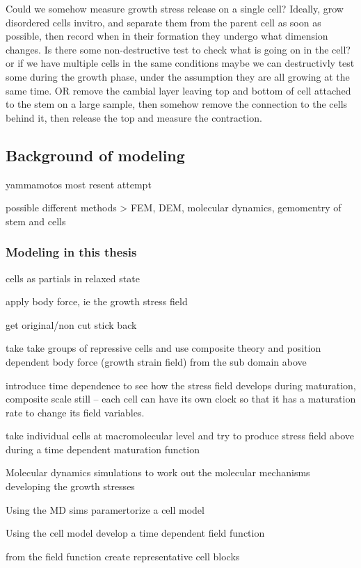 \documentclass{article}
\begin{document}
Could we somehow measure growth stress release on a single cell?
Ideally, grow disordered cells invitro, and separate them from the parent cell
as soon as possible, then record when in their formation they undergo what
dimension changes. Is there some non-destructive test to check what is going on in the cell? or if we have multiple cells in the same conditions maybe we can destructivly test some during the growth phase, under the assumption they are all growing at the same time.
OR
remove the cambial layer leaving top and bottom of cell attached to the stem on a large sample,
then somehow remove the connection to the cells behind it, then release the top and measure the contraction.


\subsection{Background of modeling}

yammamotos most resent attempt

possible different methods > FEM, DEM, molecular dynamics, gemomentry of stem
and cells

\subsubsection{Modeling in this thesis}
cells as partials in relaxed state

apply body force, ie the growth stress field

get original/non cut stick back

take take groups of repressive cells and use composite theory and position dependent body force
(growth strain field) from the sub domain above

introduce time dependence to see how the stress field develops during
maturation, composite scale still -- each cell can have its own clock so that it
has a maturation rate to change its field variables.

take individual cells at macromolecular level and try to produce stress field
above during a time dependent maturation function

Molecular dynamics simulations to work out the molecular mechanisms developing the growth stresses

Using the MD sims paramertorize a cell model

Using the cell model develop a time dependent field function

from the field function create representative cell blocks
\end{document}
